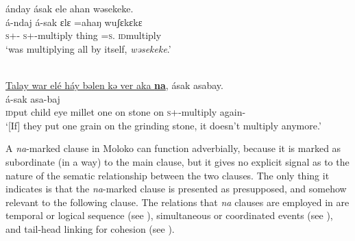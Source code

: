       \medskip
ánday  ásak  ele  ahan  wəsekeke. \\      
\gll á-ndaj á-sak   ɛlɛ      =ahaŋ  wuʃɛkɛkɛ\\
     \textsc{s}+{\IFV}-{\PRG}  \textsc{s}+{\IFV}-multiply   thing  =\textsc{s}.{\POSS}   \textsc{id}multiply\\
\glt  ‘was multiplying all by itself, \textit{wəsekeke}.’
\z

\ea \label{ex:11:14}
\\
\underline{Talay  war  elé  háy  bəlen  kə  ver  aka  \textbf{na}},  ásak  asabay. \\
\gll  {}          á-sak  asa-baj\\
      \textsc{id}put  child  eye  millet  one  on  stone  on  {\PSP} \textsc{s}+{\IFV}-multiply  again-{\NEG}\\
\glt  ‘[If] they put one grain on the grinding stone, it doesn’t multiply anymore.’
\z

\largerpage
A \textit{na}{}-marked clause in Moloko can function adverbially, because it is marked as subordinate (in a way) to the main clause, but it gives no explicit signal as to the nature of the sematic relationship between the two clauses.  The only thing it indicates is that the \textit{na}{}-marked clause is presented as presupposed, and somehow relevant to the following clause. The relations that \textit{na} clauses are employed in are temporal or logical sequence (see ), simultaneous or coordinated events (see ), and tail-head linking for cohesion (see ).

